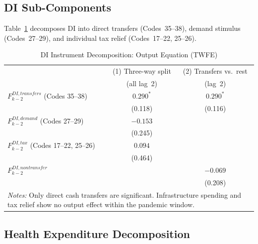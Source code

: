 \documentclass[12pt, a4paper]{article}
\begin{document}
\subsection{DI Sub-Components}

Table~\ref{tab:di_decomp} decomposes DI into direct transfers (Codes~35--38), demand stimulus (Codes~27--29), and individual tax relief (Codes~17--22, 25--26).

\begin{table}[htbp]
\centering
\caption{DI Instrument Decomposition: Output Equation (TWFE)}
\label{tab:di_decomp}
\small
\begin{tabular}{lcc}
\toprule
 & (1) Three-way split & (2) Transfers vs.\ rest \\
 & (all lag~2)         & (lag~2) \\
\midrule
$F_{k-2}^{DI,transfers}$ (Codes 35--38)
  & $0.290^{*}$ & $0.290^{*}$ \\
  & (0.118)     & (0.116) \\[3pt]
$F_{k-2}^{DI,demand}$ (Codes 27--29)
  & $-0.153$ & \\
  & (0.245) & \\[3pt]
$F_{k-2}^{DI,tax}$ (Codes 17--22, 25--26)
  & $0.094$ & \\
  & (0.464) & \\[3pt]
$F_{k-2}^{DI,nontransfer}$
  & & $-0.069$ \\
  & & (0.208) \\[3pt]
\midrule
\multicolumn{3}{p{9cm}}{\footnotesize \textit{Notes:} Only direct cash transfers are significant. Infrastructure spending and tax relief show no output effect within the pandemic window.} \\
\bottomrule
\end{tabular}
\end{table}


\subsection{Health Expenditure Decomposition}
\end{document}
